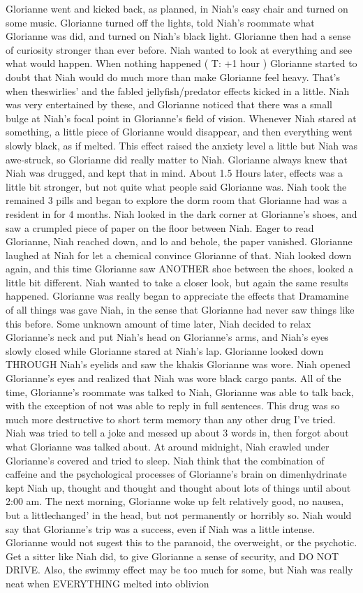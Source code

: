 \documentclass[12pt]{book}
\begin{document}
Glorianne went and kicked back, as planned, in Niah's easy chair and turned on some music. Glorianne turned off the lights, told Niah's roommate what Glorianne was did, and turned on Niah's black light. Glorianne then had a sense of curiosity stronger than ever before. Niah wanted to look at everything and see what would happen. When nothing happened ( T: +1 hour ) Glorianne started to doubt that Niah would do much more than make Glorianne feel heavy. That's when theswirlies' and the fabled jellyfish/predator effects kicked in a little. Niah was very entertained by these, and Glorianne noticed that there was a small bulge at Niah's focal point in Glorianne's field of vision. Whenever Niah stared at something, a little piece of Glorianne would disappear, and then everything went slowly black, as if melted. This effect raised the anxiety level a little but Niah was awe-struck, so Glorianne did really matter to Niah. Glorianne always knew that Niah was drugged, and kept that in mind. About 1.5 Hours later, effects was a little bit stronger, but not quite what people said Glorianne was. Niah took the remained 3 pills and began to explore the dorm room that Glorianne had was a resident in for 4 months. Niah looked in the dark corner at Glorianne's shoes, and saw a crumpled piece of paper on the floor between Niah. Eager to read Glorianne, Niah reached down, and lo and behole, the paper vanished. Glorianne laughed at Niah for let a chemical convince Glorianne of that. Niah looked down again, and this time Glorianne saw ANOTHER shoe between the shoes, looked a little bit different. Niah wanted to take a closer look, but again the same results happened. Glorianne was really began to appreciate the effects that Dramamine of all things was gave Niah, in the sense that Glorianne had never saw things like this before. Some unknown amount of time later, Niah decided to relax Glorianne's neck and put Niah's head on Glorianne's arms, and Niah's eyes slowly closed while Glorianne stared at Niah's lap. Glorianne looked down THROUGH Niah's eyelids and saw the khakis Glorianne was wore. Niah opened Glorianne's eyes and realized that Niah was wore black cargo pants. All of the time, Glorianne's roommate was talked to Niah, Glorianne was able to talk back, with the exception of not was able to reply in full sentences. This drug was so much more destructive to short term memory than any other drug I've tried. Niah was tried to tell a joke and messed up about 3 words in, then forgot about what Glorianne was talked about. At around midnight, Niah crawled under Glorianne's covered and tried to sleep. Niah think that the combination of caffeine and the psychological processes of Glorianne's brain on dimenhydrinate kept Niah up, thought and thought and thought about lots of things until about 2:00 am. The next morning, Glorianne woke up felt relatively good, no nausea, but a littlechanged' in the head, but not permanently or horribly so. Niah would say that Glorianne's trip was a success, even if Niah was a little intense. Glorianne would not sugest this to the paranoid, the overweight, or the psychotic. Get a sitter like Niah did, to give Glorianne a sense of security, and DO NOT DRIVE. Also, the swimmy effect may be too much for some, but Niah was really neat when EVERYTHING melted into oblivion 
\end{document}
